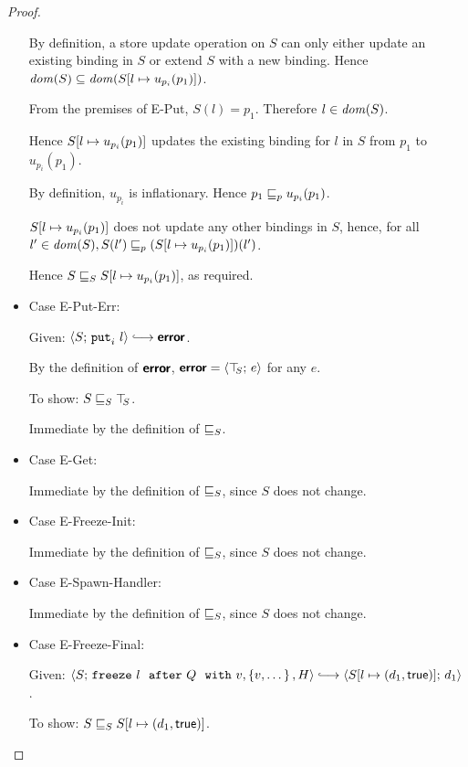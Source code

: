 \begin{proof}
\begin{itemize}
      By definition, a store update operation on $S$ can only either
      update an existing binding in $S$ or extend $S$ with a new
      binding.  Hence $\mathit{dom}(S) \subseteq
      \mathit{dom}(S[l \mapsto u_{p_i}(p_1)])$.

      From the premises of {\sc E-Put}, $S(l) = p_1$.  Therefore $l
      \in \mathit{dom}(S)$.

      Hence $S[l \mapsto u_{p_i}(p_1)]$ updates the existing
      binding for $l$ in $S$ from $p_1$ to $u_{p_i}(p_1)$.

      By definition, $u_{p_i}$ is inflationary.  Hence $p_1 \sqsubseteq_p
      u_{p_i}(p_1)$.

      $S[l \mapsto u_{p_i}(p_1)]$ does not update any other
      bindings in $S$, hence, for all $l' \in \mathit{dom}(S), S(l') \sqsubseteq_p
      (S[l \mapsto u_{p_i}(p_1)])(l')$.

      Hence $S \sqsubseteq_S S[l \mapsto u_{p_i}(p_1)]$, as required.

    \item Case {\sc E-Put-Err}:

      Given: $\config{S}{\putiexp{l}} \parstepsto \error$.

      By the definition of $\textbf{\textsf{error}}$, $\textbf{\textsf{error}} = \langle \top\hspace{-0.85mm}_{S};\, e \rangle$ for
      any $e$.

      To show: $S \sqsubseteq_S \top\hspace{-0.85mm}_{S}$.

      Immediate by the definition of $ \sqsubseteq_S $.

    \item Case {\sc E-Get}:

      Immediate by the definition of $ \sqsubseteq_S $, since $S$ does
      not change.

    \item Case {\sc E-Freeze-Init}:

      Immediate by the definition of $ \sqsubseteq_S $, since $S$ does
      not change.

    \item Case {\sc E-Spawn-Handler}:

      Immediate by the definition of $ \sqsubseteq_S $, since $S$ does
      not change.

    \item Case {\sc E-Freeze-Final}:

      Given: $\config{S}{\freezeafterfull{l}{Q}{v}{\setof{v, \dots}}{H}}
      \parstepsto \config{\extS{S}{l}{d_1}{\frozentrue}}{d_1}$.

      To show: $S \sqsubseteq_S S[l \mapsto (d_1, \textsf{true})]$.


\end{itemize}
\end{proof}
